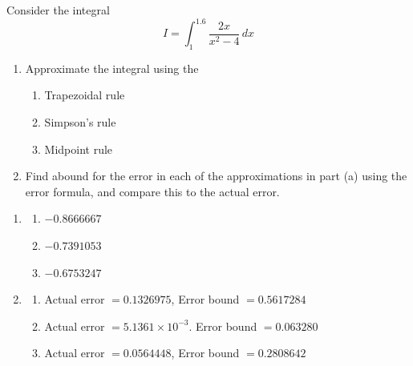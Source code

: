 \begin{myexercise}%
Consider the integral 
\[I=\int_1^{1.6}\frac{2x}{x^2-4}\,dx\]
\begin{enumerate}[label=(\alph*)]
\item Approximate the integral using the
\begin{enumerate}[label=\roman*.]
\item Trapezoidal rule
\item Simpson's rule
\item Midpoint rule
\end{enumerate}
\item Find abound for the error in each of the approximations in part (a) using the error formula, and compare this to the actual error.
\end{enumerate}

\begin{mysolution}
\begin{enumerate}[label=(\alph*)]
\item 
\begin{enumerate}[label=\roman*.]
\item $-0.8666667$
\item $-0.7391053$
\item $-0.6753247$
\end{enumerate}
\item 
\begin{enumerate}[label=\roman*.]
\item Actual error $=0.1326975$, Error bound $=0.5617284$
\item Actual error $= 5.1361\times10^{-3}$. Error bound $=0.063280$
\item Actual error $=0.0564448$, Error bound $=0.2808642$
\end{enumerate}
\end{enumerate}
\end{mysolution}
\end{myexercise}




